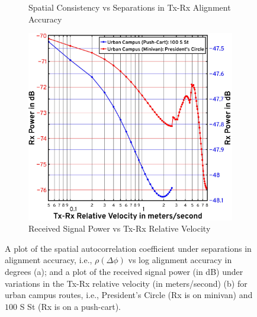 \documentclass[10pt, twocolumn]{IEEEtran}
\begin{document}
{\begin{figure} [t]
\begin{subfigure}{0.4925\linewidth}
        \caption{Spatial Consistency vs Separations in Tx-Rx Alignment Accuracy}
        \label{F8a}
    \end{subfigure}
    \begin{subfigure}{0.4975\linewidth}
        \centering
        \includegraphics[width=1.0\linewidth]{figs/rx_power_vs_velocity.pdf}
        \caption{Received Signal Power vs Tx-Rx Relative Velocity}
        \label{F8b}
    \end{subfigure}
    \vspace{-8mm}
    \caption{A plot of the spatial autocorrelation coefficient under separations in alignment accuracy, i.e., $\rho(\Delta \phi)$ vs log alignment accuracy in degrees (a); and a plot of the received signal power (in dB) under variations in the Tx-Rx relative velocity (in meters/second) (b) for urban campus routes, i.e., President's Circle (Rx is on minivan) and $100$ S St (Rx is on a push-cart).}
    \label{F8}
\end{figure}

}
\end{document}
